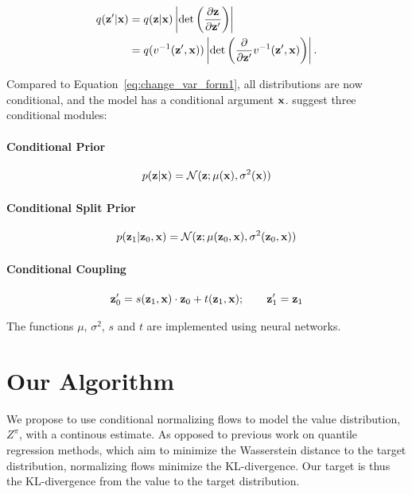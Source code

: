 \documentclass[twoside]{article}
\begin{document}
\begin{align}
  q(\textbf{z}^\prime \vert \textbf{x}) & = q(\textbf{z} \vert \textbf{x}) \left\lvert \det
  \left( \frac{\partial \textbf{z}}{\partial \textbf{z}^\prime} \right) \right\rvert
  \nonumber                                                                                          \\
                            & = q(v^{-1}(\textbf{z}^\prime, \textbf{x})) \left\lvert \det \left( \frac{\partial}
  {\partial \textbf{z}^\prime} v^{-1}(\textbf{z}^\prime, \textbf{x}) \right) \right\rvert.
  \label{eq:cond_change_var_form1}
\end{align}

\noindent
Compared to Equation~\eqref{eq:change_var_form1}, all distributions are now
conditional, and the model has a conditional argument \(\textbf{x}\).
\citet{winkler19} suggest three conditional modules:

\paragraph{Conditional Prior}
\begin{equation*}
  p(\textbf{z} \vert \textbf{x}) = \mathcal{N}(\textbf{z} ; \mu(\textbf{x}), \sigma^2(\textbf{x}))
\end{equation*}
\paragraph{Conditional Split Prior}
\begin{equation*}
  p(\textbf{z}_1 \vert \textbf{z}_0, \textbf{x}) =
  \mathcal{N} (\textbf{z} ; \mu(\textbf{z}_0, \textbf{x}), \sigma^2(\textbf{z}_0, \textbf{x}))
\end{equation*}
\paragraph{Conditional Coupling}
\begin{equation*}
  \textbf{z}^\prime_0 =
  s(\textbf{z}_1, \textbf{x}) \cdot \textbf{z}_0 + t(\textbf{z}_1, \textbf{x}); \qquad \textbf{z}^\prime_1 = \textbf{z}_1
\end{equation*}

The functions \(\mu\), \(\sigma^2\), \(s\) and \(t\) are implemented using
neural networks.

\section{Our Algorithm}

We propose to use conditional normalizing flows to model the value distribution,
\(Z^\pi\), with a continous estimate. As opposed to previous work on
quantile regression methods, which aim to minimize the Wasserstein distance
to the target distribution, normalizing flows minimize the KL-divergence. Our
target is thus the KL-divergence from the value to the target distribution.
\end{document}
